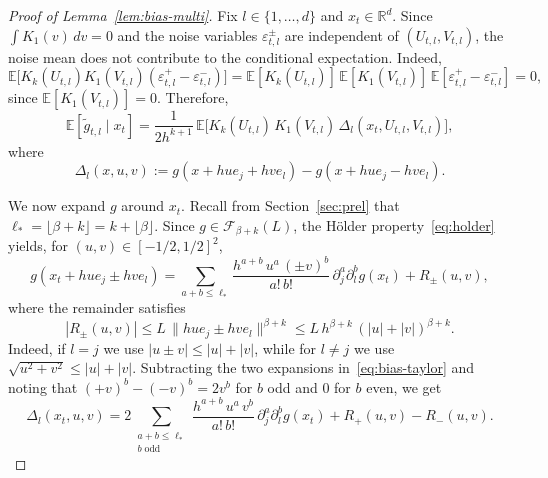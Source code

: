 \documentclass{article}
\renewcommand{\leq}{\leqslant}
\theoremstyle{definition}
\begin{document}
\begin{proof}[Proof of Lemma~\ref{lem:bias-multi}]
Fix $l\in\{1,\dots,d\}$ and $x_t\in\mathbb{R}^d$. Since $\int K_1(v)\,dv=0$ and the noise variables $\varepsilon^\pm_{t,l}$ are
independent of $(U_{t,l},V_{t,l})$, the noise mean does not contribute to the
conditional expectation. Indeed,
\[
\mathbb{E}\bigl[K_k(U_{t,l})K_1(V_{t,l})(\varepsilon^+_{t,l}-\varepsilon^-_{t,l})\bigr]
=\mathbb{E}[K_k(U_{t,l})]\,\mathbb{E}[K_1(V_{t,l})]\,
\mathbb{E}[\varepsilon^+_{t,l}-\varepsilon^-_{t,l}]=0,
\]
since $\mathbb{E}[K_1(V_{t,l})]=0$. Therefore,
\begin{equation}
\label{eq:bias-Delta-form}
\mathbb{E}[\tilde{g}_{t,l}\mid x_t]
=\frac{1}{2h^{k+1}}\,\mathbb{E}\bigl[K_k(U_{t,l})\,K_1(V_{t,l})\,
\Delta_l(x_t,U_{t,l},V_{t,l})\bigr],
\end{equation}
where 
$$
\Delta_l(x,u,v):=g(x+hue_j+hve_l)-g(x+hue_j-hve_l).
$$

We now expand $g$ around $x_t$. Recall from Section~\ref{sec:prel} 
that $\ell_*=\lfloor\beta+k\rfloor=k+\lfloor\beta\rfloor$. Since 
$g\in\mathcal{F}_{\beta+k}(L)$, the H\"older 
property~\eqref{eq:holder} yields, for $(u,v)\in[-1/2,1/2]^2$,
\begin{equation}
\label{eq:bias-taylor}
g(x_t+hue_j\pm hve_l)
=\sum_{a+b\leq \ell_*}
\frac{h^{a+b}\,u^a\,(\pm v)^b}{a!\,b!}\,
\partial_j^a\partial_l^b g(x_t)+R_\pm(u,v),
\end{equation}
where the remainder satisfies
$$
|R_\pm(u,v)|\leq L\,\|hue_j\pm hve_l\|^{\beta+k}
\leq L\,h^{\beta+k}\,(|u|+|v|)^{\beta+k}.
$$
Indeed, if $l=j$ we use $|u\pm v|\leq |u|+|v|$, while for $l\neq j$ 
we use $\sqrt{u^2+v^2}\leq |u|+|v|$. Subtracting the two expansions 
in~\eqref{eq:bias-taylor} and noting that 
$(+v)^b-(-v)^b=2v^b$ for $b$ odd and $0$ for $b$ even, we get
\begin{equation}
\label{eq:bias-Delta-expansion}
\Delta_l(x_t,u,v)
=2\!\!\!\sum_{\substack{a+b\leq \ell_*\\b\;\mathrm{odd}}}\!\!
\frac{h^{a+b}\,u^a\,v^b}{a!\,b!}\,
\partial_j^a\partial_l^b g(x_t)
+R_+(u,v)-R_-(u,v).
\end{equation}


\end{proof}
\end{document}

